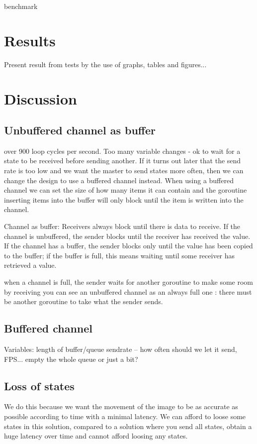 \documentclass[12pt, a4paper, oneside]{article}
\begin{document}
benchmark


\section{Results}
Present result from tests by the use of graphs, tables and figures...
\newpage
\section{Discussion}
\subsection{Unbuffered channel as buffer}
over 900 loop cycles per second. Too many variable changes - ok to wait for a state to be received before sending another. If it turns out later that the send rate is too low and we want the master to send states more often, then we can change the design to use a buffered channel instead. When using a buffered channel we can set the size of how many items it can contain and the goroutine inserting items into the buffer will only block until the item is written into the channel. 

Channel as buffer:
Receivers always block until there is data to receive. If the channel is unbuffered, the sender blocks until the receiver has received the value. If the channel has a buffer, the sender blocks only until the value has been copied to the buffer; if the buffer is full, this means waiting until some receiver has retrieved a value.

when a channel is full, the sender waits for another goroutine to make some room by receiving
you can see an unbuffered channel as an always full one : there must be another goroutine to take what the sender sends.

\subsection{Buffered channel}
Variables:
length of buffer/queue
sendrate – how often should we let it send, FPS...
empty the whole queue or just a bit?

\subsection{Loss of states}
We do this because we want the movement of the image to be as accurate as possible according to time with a minimal latency. 
We can afford to loose some states in this solution, compared to a solution where you send all states, obtain a huge latency over time and cannot afford loosing any states.
\end{document}
